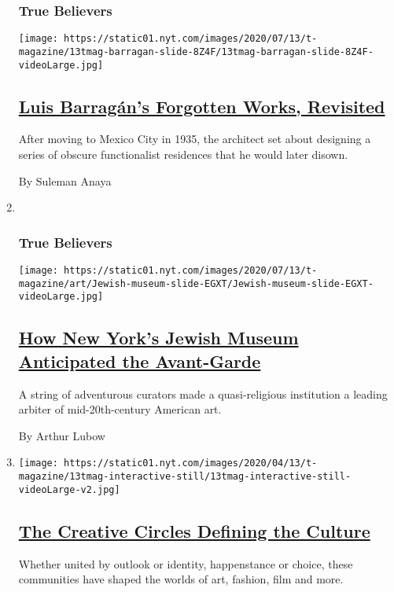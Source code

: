 \begin{enumerate}
{  \subsubsection{True Believers}\label{true-believers-3}}

  \texttt{[image: https://static01.nyt.com/images/2020/07/13/t-magazine/13tmag-barragan-slide-8Z4F/13tmag-barragan-slide-8Z4F-videoLarge.jpg]}

  \hypertarget{luis-barraguxe1ns-forgotten-works-revisited}{%
  \subsection{\texorpdfstring{\href{/2020/07/24/t-magazine/luis-barragan.html}{Luis
  Barragán's Forgotten Works,
  Revisited}}{Luis Barragán's Forgotten Works, Revisited}}\label{luis-barraguxe1ns-forgotten-works-revisited}}

  After moving to Mexico City in 1935, the architect set about designing
  a series of obscure functionalist residences that he would later
  disown.

  By Suleman Anaya
\item ~
  \hypertarget{true-believers-4}{%
  \subsubsection{True Believers}\label{true-believers-4}}

  \texttt{[image: https://static01.nyt.com/images/2020/07/13/t-magazine/art/Jewish-museum-slide-EGXT/Jewish-museum-slide-EGXT-videoLarge.jpg]}

  \hypertarget{how-new-yorks-jewish-museum-anticipated-the-avant-garde}{%
  \subsection{\texorpdfstring{\href{/2020/07/23/t-magazine/jewish-museum-new-york.html}{How
  New York's Jewish Museum Anticipated the
  Avant-Garde}}{How New York's Jewish Museum Anticipated the Avant-Garde}}\label{how-new-yorks-jewish-museum-anticipated-the-avant-garde}}

  A string of adventurous curators made a quasi-religious institution a
  leading arbiter of mid-20th-century American art.

  By Arthur Lubow
\item
  \texttt{[image: https://static01.nyt.com/images/2020/04/13/t-magazine/13tmag-interactive-still/13tmag-interactive-still-videoLarge-v2.jpg]}

  \hypertarget{the-creative-circles-defining-the-culture}{%
  \subsection{\texorpdfstring{\href{/interactive/2020/04/13/t-magazine/culture-issue-2020.html}{The
  Creative Circles Defining the
  Culture}}{The Creative Circles Defining the Culture}}\label{the-creative-circles-defining-the-culture}}

  Whether united by outlook or identity, happenstance or choice, these
  communities have shaped the worlds of art, fashion, film and more.
\end{enumerate}

